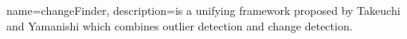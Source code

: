{
  name=changeFinder,
  description={is a unifying framework proposed by Takeuchi and Yamanishi \cite{takeuchi2006unifying} which combines outlier detection and change detection.}
}